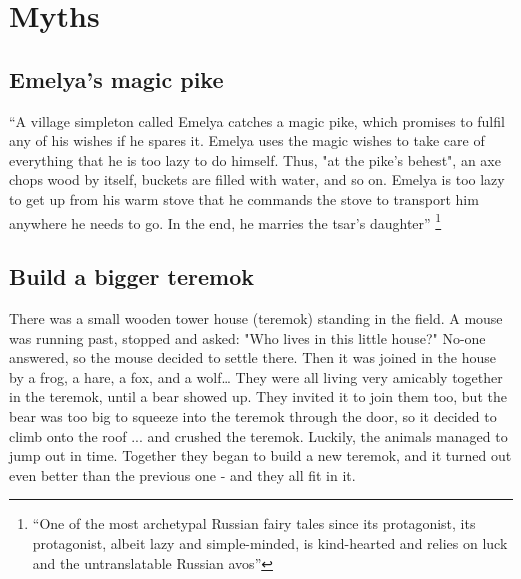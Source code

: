 \chapter{Myths}

\section{Emelya's magic pike}


``A village simpleton called Emelya catches a magic pike, which promises to fulfil any of his wishes if he spares it. Emelya uses the magic wishes to take care of everything that he is too lazy to do himself. Thus, "at the pike's behest", an axe chops wood by itself, buckets are filled with water, and so on. Emelya is too lazy to get up from his warm stove that he commands the stove to transport him anywhere he needs to go. In the end, he marries the tsar's daughter''
\footnote{``One of the most archetypal Russian fairy tales since its protagonist, its protagonist, albeit lazy and simple-minded, is kind-hearted and relies on luck and the untranslatable Russian avos'' %
}



\section{Build a bigger teremok}

There was a small wooden tower house (teremok) standing in the field. A mouse was running past, stopped and asked: "Who lives in this little house?" No-one answered, so the mouse decided to settle there. Then it was joined in the house by a frog, a hare, a fox, and a wolf… They were all living very amicably together in the teremok, until a bear showed up. They invited it to join them too, but the bear was too big to squeeze into the teremok through the door, so it decided to climb onto the roof ... and crushed the teremok. Luckily, the animals managed to jump out in time. Together they began to build a new teremok, and it turned out even better than the previous one - and they all fit in it.

